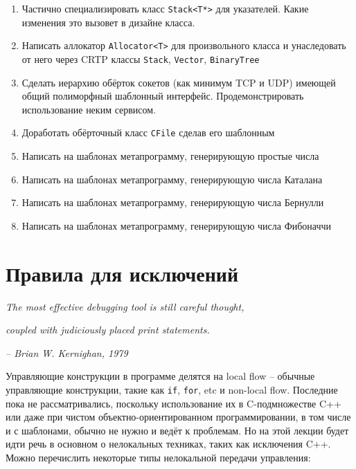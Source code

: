 \documentclass[a4paper,12pt,oneside]{article}
\begin{document}
\begin{enumerate}
\item
Частично специализировать класс \lstinline!Stack<T*>! для указателей. Какие изменения это вызовет в дизайне класса.

\item
Написать аллокатор \lstinline!Allocator<T>! для произвольного класса и унаследовать от него через CRTP классы \lstinline!Stack!, \lstinline!Vector!, \lstinline!BinaryTree!

\item
Сделать иерархию обёрток сокетов (как минимум TCP и UDP) имеющей общий полиморфный шаблонный интерфейс. Продемонстрировать использование неким сервисом.

\item
Доработать обёрточный класс \lstinline!CFile! сделав его шаблонным

\item
Написать на шаблонах метапрограмму, генерирующую простые числа

\item
Написать на шаблонах метапрограмму, генерирующую числа Каталана

\item
Написать на шаблонах метапрограмму, генерирующую числа Бернулли 

\item
Написать на шаблонах метапрограмму, генерирующую числа Фибоначчи

\end{enumerate}

\pagebreak
\section{Правила для исключений}

\hfill\textit{The most effective debugging tool is still careful thought,}

\hfill\textit{coupled with judiciously placed print statements.}{\vspace{0.5em}}

\hfill\textit{-- Brian W. Kernighan, 1979}

Управляющие конструкции в программе делятся на local flow -- обычные управляющие конструкции, такие как \lstinline!if!, \lstinline!for!, etc и non-local flow. Последние пока не рассматривались, поскольку использование их в C-подмножестве C++ или даже при чистом объектно-ориентированном программировании, в том числе и с шаблонами, обычно не нужно и ведёт к проблемам. Но на этой лекции будет идти речь в основном о нелокальных техниках, таких как исключения C++. Можно перечислить некоторые типы нелокальной передачи управления:
\end{document}

